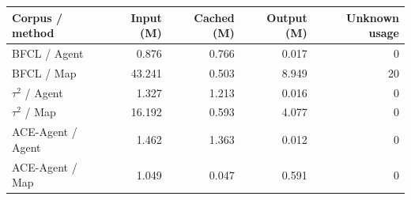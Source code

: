 \begin{tabular}{lrrrr}
\toprule
Corpus / method & Input (M) & Cached (M) & Output (M) & Unknown usage \\
\midrule
BFCL / Agent & 0.876 & 0.766 & 0.017 & 0 \\
BFCL / Map & 43.241 & 0.503 & 8.949 & 20 \\
$\tau^2$ / Agent & 1.327 & 1.213 & 0.016 & 0 \\
$\tau^2$ / Map & 16.192 & 0.593 & 4.077 & 0 \\
ACE-Agent / Agent & 1.462 & 1.363 & 0.012 & 0 \\
ACE-Agent / Map & 1.049 & 0.047 & 0.591 & 0 \\
\bottomrule
\end{tabular}
